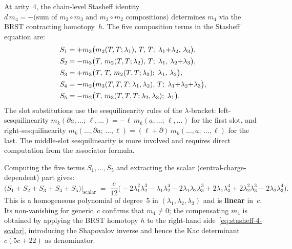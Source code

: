 \documentclass[11pt]{article}
\begin{document}
At arity~$4$, the chain-level Stasheff identity
$d\,m_4 = -\bigl(\text{sum of } m_2 \circ m_3
\text{ and } m_3 \circ m_2 \text{ compositions}\bigr)$
determines $m_4$ via the BRST contracting homotopy~$h$.
The five composition terms in the Stasheff equation are:
\begin{alignat}{2}\label{eq:stasheff-arity4}
S_1 &= +m_3\bigl(m_2(T,T;\lambda_1),\, T,\, T;\;
  \lambda_1{+}\lambda_2,\, \lambda_3\bigr), \notag\\
S_2 &= -m_3\bigl(T,\, m_2(T,T;\lambda_2),\, T;\;
  \lambda_1,\, \lambda_2{+}\lambda_3\bigr), \notag\\
S_3 &= +m_3\bigl(T,\, T,\, m_2(T,T;\lambda_3);\;
  \lambda_1,\, \lambda_2\bigr), \\
S_4 &= -m_2\bigl(m_3(T,T,T;\lambda_1,\lambda_2),\, T;\;
  \lambda_1{+}\lambda_2{+}\lambda_3\bigr), \notag\\
S_5 &= -m_2\bigl(T,\, m_3(T,T,T;\lambda_2,\lambda_3);\;
  \lambda_1\bigr). \notag
\end{alignat}
The slot substitutions use the sesquilinearity rules of the
$\lambda$-bracket: left-sesquilinearity
$m_k(\partial a, \ldots;\, \ell, \ldots) =
-\ell\, m_k(a, \ldots;\, \ell, \ldots)$
for the first slot, and right-sesquilinearity
$m_k(\ldots, \partial a;\, \ldots, \ell) =
(\ell + \partial)\,m_k(\ldots, a;\, \ldots, \ell)$ for the last.
The middle-slot sesquilinearity is more involved and requires
direct computation from the associator formula.

\begin{proposition}
\label{comp:stasheff-4-scalar}
Computing the five terms $S_1, \ldots, S_5$ and extracting
the scalar (central-charge-dependent) part gives:
\begin{equation}\label{eq:stasheff-4-scalar}
\bigl(S_1 + S_2 + S_3 + S_4 + S_5\bigr)\big|_{\text{scalar}}
\;=\;
\frac{c}{12}\bigl(
-2\lambda_1^2\lambda_2^3
- \lambda_1\lambda_2^4
- 2\lambda_1\lambda_2\lambda_3^3
+ 2\lambda_1\lambda_3^4
+ 2\lambda_2^2\lambda_3^3
- 2\lambda_2\lambda_3^4\bigr).
\end{equation}
This is a homogeneous polynomial of degree~$5$ in
$(\lambda_1,\lambda_2,\lambda_3)$ and is \textbf{linear} in~$c$.
Its non-vanishing for generic~$c$ confirms that
$m_4 \ne 0$; the compensating $m_4$ is obtained by applying the
BRST homotopy $h$ to the right-hand
side~\eqref{eq:stasheff-4-scalar}, introducing the Shapovalov
inverse and hence the Kac determinant $c(5c+22)$ as denominator.
\end{proposition}
\end{document}

